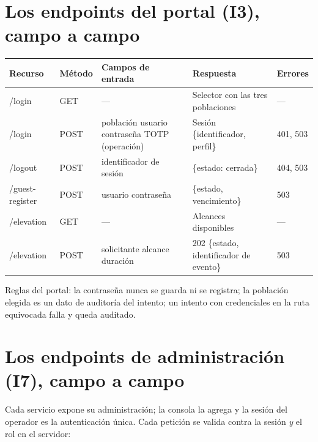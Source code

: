 \documentclass[11pt,a4paper]{article}
\begin{document}
\section{Los endpoints del portal (I3), campo a campo}

\begin{longtable}{p{3.0cm}p{1.6cm}p{4.4cm}p{3.0cm}p{2.0cm}}
\toprule
\textbf{Recurso} & \textbf{Método} & \textbf{Campos de entrada} & \textbf{Respuesta} & \textbf{Errores}\\
\midrule
/login & GET & --- & Selector con las tres poblaciones & ---\\
/login & POST & población \textperiodcentered{} usuario \textperiodcentered{} contraseña \textperiodcentered{} TOTP (operación) & Sesión \{identificador, perfil\} & 401, 503\\
/logout & POST & identificador de sesión & \{estado: cerrada\} & 404, 503\\
/guest-register & POST & usuario \textperiodcentered{} contraseña & \{estado, vencimiento\} & 503\\
/elevation & GET & --- & Alcances disponibles & ---\\
/elevation & POST & solicitante \textperiodcentered{} alcance \textperiodcentered{} duración & 202 \{estado, identificador de evento\} & 503\\
\bottomrule
\end{longtable}

Reglas del portal: la contraseña nunca se guarda ni se registra; la población elegida es un dato de auditoría del intento; un intento con credenciales en la ruta equivocada falla y queda auditado.

\section{Los endpoints de administración (I7), campo a campo}

Cada servicio expone su administración; la consola la agrega y la sesión del operador es la autenticación única. Cada petición se valida contra la sesión \emph{y} el rol en el servidor:
\end{document}
